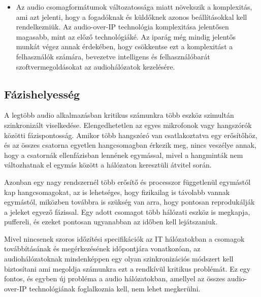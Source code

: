 \begin{itemize}
	\item Az audio csomagformátumok változatossága miatt növekszik a komplexitás,
	      ami azt jelenti, hogy a fogadóknak és küldőknek azonos beállításokkal kell
	      rendelkezniük. Az audio-over-IP technológia komplexitása jelentősen magasabb,
	      mint az előző technológiáké. Az iparág még mindig jelentős munkát végez annak
	      érdekében, hogy csökkentse ezt a komplexitást a felhasználók számára, bevezetve
	      intelligens és felhasználóbarát szoftvermegoldásokat az audiohálózatok
	      kezelésére.
\end{itemize}
\subsection{Fázishelyesség}
A legtöbb audio alkalmazásban kritikus számunkra több eszköz szimultán szinkronizált viselkedése.
Elengedhetetlen az egyes mikrofonok vagy hangszórók közötti fázispontosság.
Amikor több hangszóró van csatlakoztatva egy erősítőhöz, és az összes csatorna
egyetlen hangcsomagban érkezik meg, nincs veszélye annak, hogy a csatornák
ellenfázisban lennének egymással, mivel a hangminták nem változhatnak el egymás
között a hálózaton keresztüli átvitel során. 

Azonban egy nagy rendszernél több erősítő és processzor függetlenül egymástól kap hangcsomagokat, 
az is lehetséges, hogy fizikailag is távolabb vannak egymástól,
miközben továbbra is szükség van arra, hogy pontosan reprodukálják a jeleket egyező fázissal.
Egy adott csomagot több hálózati eszköz is megkapja, puffereli, és ezeket
pontosan ugyanabban az időben kell lejátszaniuk.

Mivel nincsenek szoros időzítési specifikációk az IT hálózatokban a csomagok továbbításának és
megérkezésének időpontjára vonatkozóan, az audiohálózatoknak mindenképpen egy olyan szinkronizációs
módszert kell biztosítani ami megoldja számunkra ezt a rendkívül kritikus problémát.
Ez egy fontos, és egyben új probléma a audio hálózatokban, amellyel az összes
audio-over-IP technológiának foglalkoznia kell, nem lehet megkerülni.

